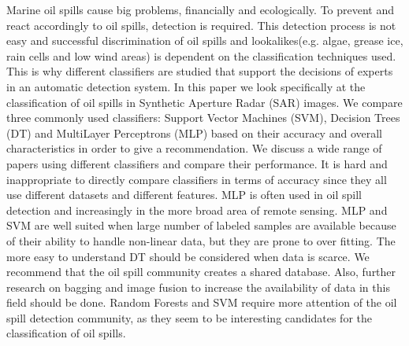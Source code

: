 Marine oil spills cause big problems, financially and ecologically. To prevent and react accordingly to oil spills, detection is required. This detection process is not easy and successful discrimination of oil spills and lookalikes(e.g. algae, grease ice, rain cells and low wind areas) is dependent on the classification techniques used. This is why different classifiers are studied that support the decisions of experts in an automatic detection system. In this paper we look specifically at the classification of oil spills in Synthetic Aperture Radar (SAR) images. We compare three commonly used classifiers: Support Vector Machines (SVM), Decision Trees (DT) and MultiLayer Perceptrons (MLP) based on their accuracy and overall characteristics in order to give a recommendation. We discuss a wide range of papers using different classifiers and compare their performance. It is hard and inappropriate to directly compare classifiers in terms of accuracy since they all use different datasets and different features. MLP is often used in oil spill detection and increasingly in the more broad area of remote sensing. MLP and SVM are well suited when large number of labeled samples are available because of their ability to handle non-linear data, but they are prone to over fitting. The more easy to understand DT should be considered when data is scarce. We recommend that the oil spill community creates a shared database. Also, further research on bagging and image fusion to increase the availability of data in this field should be done. Random Forests and SVM require more attention of the oil spill detection community, as they seem to be interesting candidates for the classification of oil spills.
